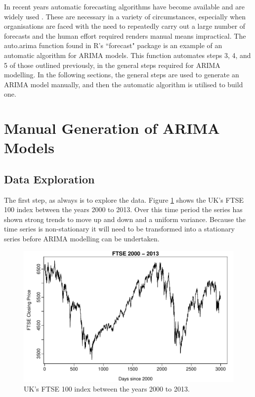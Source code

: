 In recent years automatic forecasting algorithms have become available and are widely used \citep{Hyndman08automatictime}. These are necessary in a variety of circumstances, especially when organisations are faced with the need to repeatedly carry out a large number of forecasts and the human effort required renders manual means impractical. The auto.arima function found in R's \textquotedblleft forecast" package is an example of an automatic algorithm for ARIMA models. This function automates steps 3, 4, and 5 of those outlined previously, in the general steps required for ARIMA modelling. In the following sections, the general steps are used to generate an ARIMA model manually, and then the automatic algorithm is utilised to build one.

\section{Manual Generation of ARIMA Models}
\label{sec:man_arima}
\subsection{Data Exploration}

The first step, as always is to explore the data. Figure \ref{fig:chp_ts_ftse_2000_13} shows the UK's FTSE 100 index between the years 2000 to 2013. Over this time period the series has shown strong trends to move up and down and a uniform variance. Because the time series is non-stationary it will need to be transformed into a stationary series before ARIMA modelling can be undertaken.

\begin{figure}[tbh]
\centering
\includegraphics{Figures/chp_ts_ftse_2000-13}
\caption[FTSE 100 index between the years 2000 to 2013]{UK's FTSE 100 index between the years 2000 to 2013.}
\label{fig:chp_ts_ftse_2000_13}
\end{figure}

